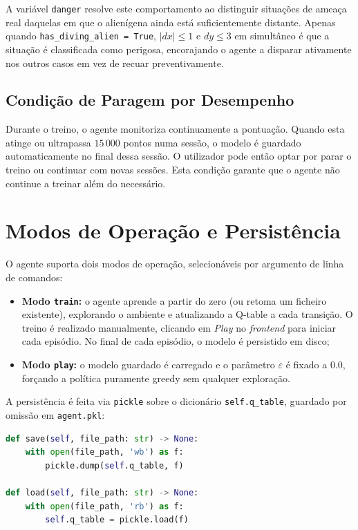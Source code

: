 \documentclass[12pt,a4paper]{article}
\begin{document}
A variável \texttt{danger} resolve este comportamento ao distinguir situações de ameaça real daquelas em que o alienígena ainda está suficientemente distante. Apenas quando \texttt{has\_diving\_alien = True}, $|dx| \leq 1$ e $dy \leq 3$ em simultâneo é que a situação é classificada como perigosa, encorajando o agente a disparar ativamente nos outros casos em vez de recuar preventivamente.

\subsection{Condição de Paragem por Desempenho}

Durante o treino, o agente monitoriza continuamente a pontuação. Quando esta atinge ou ultrapassa $15\,000$ pontos numa sessão, o modelo é guardado automaticamente no final dessa sessão. O utilizador pode então optar por parar o treino ou continuar com novas sessões. Esta condição garante que o agente não continue a treinar além do necessário.

\section{Modos de Operação e Persistência}

O agente suporta dois modos de operação, selecionáveis por argumento de linha de comandos:

\begin{itemize}
    \item \textbf{Modo \texttt{train}:} o agente aprende a partir do zero (ou retoma um ficheiro existente), explorando o ambiente e atualizando a Q-table a cada transição. O treino é realizado manualmente, clicando em \textit{Play} no \textit{frontend} para iniciar cada episódio. No final de cada episódio, o modelo é persistido em disco;
    \item \textbf{Modo \texttt{play}:} o modelo guardado é carregado e o parâmetro $\varepsilon$ é fixado a $0.0$, forçando a política puramente greedy sem qualquer exploração.
\end{itemize}

A persistência é feita via \texttt{pickle} sobre o dicionário \texttt{self.q\_table}, guardado por omissão em \texttt{agent.pkl}:

\begin{lstlisting}[language=Python, caption={Serialização e deserialização da Q-table}]
def save(self, file_path: str) -> None:
    with open(file_path, 'wb') as f:
        pickle.dump(self.q_table, f)

def load(self, file_path: str) -> None:
    with open(file_path, 'rb') as f:
        self.q_table = pickle.load(f)
\end{lstlisting}
\end{document}

